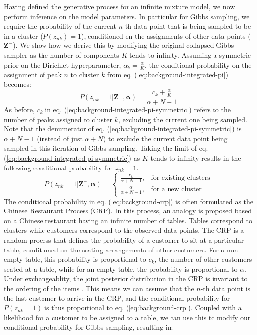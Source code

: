 Having defined the generative process for an infinite mixture model, we now perform inference on the model parameters. In particular for Gibbs sampling, we require the probability of the current $n$-th data point that is being sampled to be in a cluster ($P(z_{nk})=1$), conditioned on the assignments of other data points ($\boldsymbol{Z}^{-}$). We show how we derive this by modifying the original collapsed Gibbs sampler as the number of components $K$ tends to infinity. Assuming a symmetric prior on the Dirichlet hyperparameter, $\alpha_k=\frac{\alpha}{K}$, the conditional probability on the assignment of peak $n$ to cluster $k$ from eq. (\ref{eq:background-integrated-pi}) becomes:
\begin{equation}
P(z_{nk}=1 \vert \boldsymbol{Z}^{-}, \boldsymbol{\alpha}) = \frac{c_k + \frac{\alpha}{K}}{\alpha+N-1}
\label{eq:background-integrated-pi-symmetric}
\end{equation}
As before, $c_k$ in eq. (\ref{eq:background-integrated-pi-symmetric}) refers to the number of peaks assigned to cluster $k$, excluding the current one being sampled. Note that the denumerator of eq. (\ref{eq:background-integrated-pi-symmetric}) is $\alpha+N-1$ (instead of just $\alpha+N$) to exclude the current data point being sampled in this iteration of Gibbs sampling. Taking the limit of eq. (\ref{eq:background-integrated-pi-symmetric}) as $K$ tends to infinity results in the following conditional probability for $z_{nk}=1$:
\begin{equation}
P(z_{nk}=1 \vert \boldsymbol{Z}^{-}, \boldsymbol{\alpha}) = 
\begin{cases}
    \frac{c_k}{\alpha+N-1}, & \text{for existing clusters} \\
    \frac{\alpha}{\alpha+N-1}, & \text{for a new cluster}
\end{cases}
\label{eq:background-crp}
\end{equation}
The conditional probability in eq. (\ref{eq:background-crp}) is often formulated as the Chinese Restaurant Process (CRP). In this process, an analogy is proposed based on a Chinese restaurant having an infinite number of tables. Tables correspond to clusters while customers correspond to the observed data points. The CRP is a random process that defines the probability of a customer to sit at a particular table, conditioned on the seating arrangements of other customers. For a non-empty table, this probability is proportional to $c_k$, the number of other customers seated at a table, while for an empty table, the probability is proportional to $\alpha$. Under exchangeablity, the joint posterior distribution in the CRP is invariant to the ordering of the items \cite{aldous1985exchangeability}. This means we can assume that the $n$-th data point is the last customer to arrive in the CRP, and the conditional probability for $P(z_{nk}=1)$ is thus proportional to eq. (\ref{eq:background-crp}). Coupled with a likelihood for a customer to be assigned to a table, we can use this to modify our conditional probability for Gibbs sampling, resulting in:
